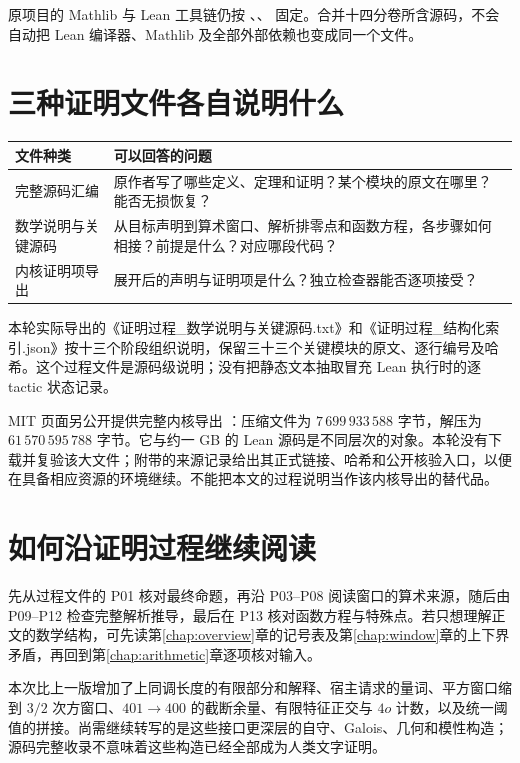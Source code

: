 原项目的 Mathlib 与 Lean 工具链仍按 、、 固定。合并十四分卷所含源码，不会自动把 Lean 编译器、Mathlib 及全部外部依赖也变成同一个文件。

\clearpage
\section{三种证明文件各自说明什么}
\begin{longtable}{@{}p{}p{}@{}}
\toprule
文件种类 & 可以回答的问题\\
\midrule
\endhead
完整源码汇编 & 原作者写了哪些定义、定理和证明？某个模块的原文在哪里？能否无损恢复？\\
数学说明与关键源码 & 从目标声明到算术窗口、解析排零点和函数方程，各步骤如何相接？前提是什么？对应哪段代码？\\
内核证明项导出 & 展开后的声明与证明项是什么？独立检查器能否逐项接受？\\
\bottomrule
\end{longtable}

本轮实际导出的《证明过程\_数学说明与关键源码.txt》和《证明过程\_结构化索引.json》按十三个阶段组织说明，保留三十三个关键模块的原文、逐行编号及哈希。这个过程文件是源码级说明；没有把静态文本抽取冒充 Lean 执行时的逐 tactic 状态记录。

MIT 页面另公开提供完整内核导出 ：压缩文件为 $7\,699\,933\,588$ 字节，解压为 $61\,570\,595\,788$ 字节。它与约一 GB 的 Lean 源码是不同层次的对象。本轮没有下载并复验该大文件；附带的来源记录给出其正式链接、哈希和公开核验入口，以便在具备相应资源的环境继续。不能把本文的过程说明当作该内核导出的替代品。

\section{如何沿证明过程继续阅读}
先从过程文件的 P01 核对最终命题，再沿 P03--P08 阅读窗口的算术来源，随后由 P09--P12 检查完整解析推导，最后在 P13 核对函数方程与特殊点。若只想理解正文的数学结构，可先读第\ref{chap:overview}章的记号表及第\ref{chap:window}章的上下界矛盾，再回到第\ref{chap:arithmetic}章逐项核对输入。

本次比上一版增加了上同调长度的有限部分和解释、宿主请求的量词、平方窗口缩到 $3/2$ 次方窗口、$401\to400$ 的截断余量、有限特征正交与 $4o$ 计数，以及统一阈值的拼接。尚需继续转写的是这些接口更深层的自守、Galois、几何和模性构造；源码完整收录不意味着这些构造已经全部成为人类文字证明。
